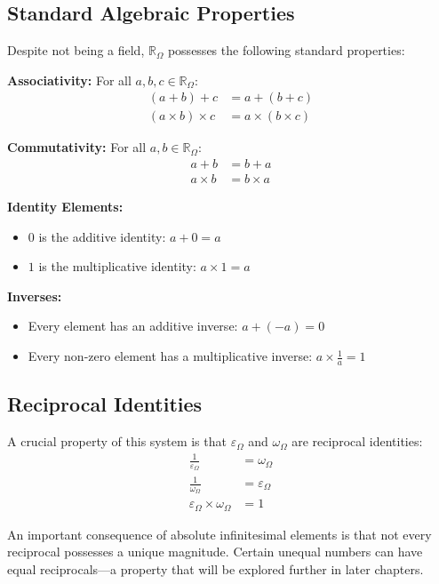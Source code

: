 \documentclass{article}
\begin{document}
\subsection{Standard Algebraic Properties}

Despite not being a field, $\mathbb{R}_\Omega$ possesses the following standard properties:

\textbf{Associativity:} For all $a, b, c \in \mathbb{R}_\Omega$:
\begin{align*}
(a + b) + c &= a + (b + c) \\
(a \times b) \times c &= a \times (b \times c)
\end{align*}

\textbf{Commutativity:} For all $a, b \in \mathbb{R}_\Omega$:
\begin{align*}
a + b &= b + a \\
a \times b &= b \times a
\end{align*}

\textbf{Identity Elements:}
\begin{itemize}
\item $0$ is the additive identity: $a + 0 = a$
\item $1$ is the multiplicative identity: $a \times 1 = a$
\end{itemize}

\textbf{Inverses:}
\begin{itemize}
\item Every element has an additive inverse: $a + (-a) = 0$
\item Every non-zero element has a multiplicative inverse: $a \times \frac{1}{a} = 1$
\end{itemize}

\subsection{Reciprocal Identities}

A crucial property of this system is that $\varepsilon_\Omega$ and $\omega_\Omega$ are reciprocal identities:
\begin{align*}
\frac{1}{\varepsilon_\Omega} &= \omega_\Omega \\
\frac{1}{\omega_\Omega} &= \varepsilon_\Omega \\
\varepsilon_\Omega \times \omega_\Omega &= 1
\end{align*}

An important consequence of absolute infinitesimal elements is that not every reciprocal possesses a unique magnitude. Certain unequal numbers can have equal reciprocals---a property that will be explored further in later chapters.
\end{document}
